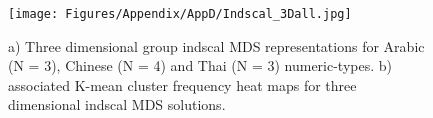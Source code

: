 \begin{figure}[tbh]
\centering \texttt{[image: Figures/Appendix/AppD/Indscal\_3Dall.jpg]}
\caption{a) Three dimensional group indscal MDS representations for Arabic (N = 3), Chinese (N = 4) and Thai (N = 3) numeric-types. b) associated K-mean cluster frequency heat maps for three dimensional indscal MDS solutions.}
\label{fig:Apx_3D_Indscal}
\end{figure}
